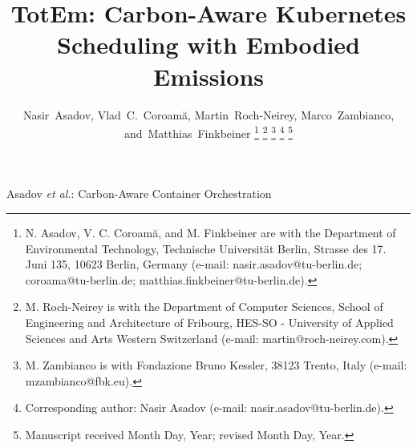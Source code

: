 \documentclass[10pt,journal,compsoc]{IEEEtran}
\begin{document}
\title{TotEm: Carbon-Aware Kubernetes Scheduling with Embodied Emissions}

\author{Nasir~Asadov,
        Vlad~C.~Coroam\u{a},
        Martin~Roch-Neirey,
        Marco~Zambianco,
        and~Matthias~Finkbeiner%
\thanks{N. Asadov, V. C. Coroam\u{a}, and M. Finkbeiner are with the Department
of Environmental Technology, Technische Universit\"at Berlin, Strasse des 17. Juni 135, 10623 Berlin, Germany
(e-mail: nasir.asadov@tu-berlin.de; coroama@tu-berlin.de; matthias.finkbeiner@tu-berlin.de).}%
\thanks{M. Roch-Neirey is with the Department of Computer Sciences, School of Engineering and Architecture of Fribourg,
HES-SO - University of Applied Sciences and Arts Western Switzerland (e-mail: martin@roch-neirey.com).}%
\thanks{M. Zambianco is with Fondazione Bruno Kessler,
38123 Trento, Italy (e-mail: mzambianco@fbk.eu).}%
\thanks{Corresponding author: Nasir Asadov (e-mail: nasir.asadov@tu-berlin.de).}%
\thanks{Manuscript received Month Day, Year; revised Month Day, Year.}}

%
{Asadov \MakeLowercase{\textit{et al.}}: Carbon-Aware Container Orchestration}
\end{document}
